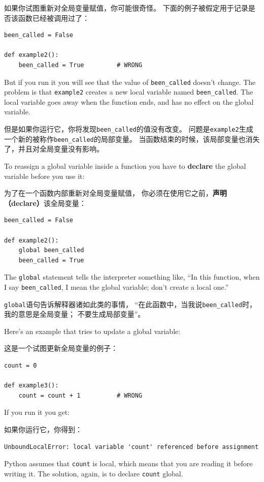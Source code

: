 \documentclass[10pt]{book}
\begin{document}
\begin{CJK}{UTF8}{gbsn}
如果你试图重新对全局变量赋值，你可能很奇怪。
下面的例子被假定用于记录是否该函数已经被调用过了：

\begin{verbatim}
been_called = False

def example2():
    been_called = True         # WRONG
\end{verbatim}
%
But if you run it you will see that the value of \verb"been_called"
doesn't change.  The problem is that {\tt example2} creates a new local
variable named \verb"been_called".  The local variable goes away when
the function ends, and has no effect on the global variable.

但是如果你运行它，你将发现\verb"been_called"的值没有改变。
问题是{\tt example2}生成一个新的被称作\verb"been_called"的局部变量。
当函数结束的时候，该局部变量也消失了，并且对全局变量没有影响。

To reassign a global variable inside a function you have to
{\bf declare} the global variable before you use it:

为了在一个函数内部重新对全局变量赋值，
你必须在使用它之前，{\bf 声明（declare）}该全局变量：

\begin{verbatim}
been_called = False

def example2():
    global been_called 
    been_called = True
\end{verbatim}
%
The {\tt global} statement tells the interpreter
something like, ``In this function, when I say \verb"been_called", I
mean the global variable; don't create a local one.''

{\tt global}语句告诉解释器诸如此类的事情，
``在此函数中，当我说\verb"been_called"时，我的意思是全局变量；
不要生成局部变量''。

Here's an example that tries to update a global variable:

这是一个试图更新全局变量的例子：

\begin{verbatim}
count = 0

def example3():
    count = count + 1          # WRONG
\end{verbatim}
%
If you run it you get:

如果你运行它，你得到：

\begin{verbatim}
UnboundLocalError: local variable 'count' referenced before assignment
\end{verbatim}
%
Python assumes that {\tt count} is local, which means
that you are reading it before writing it.  The solution, again,
is to declare {\tt count} global.


\end{CJK}
\end{document}
